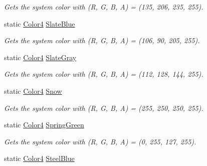 \begin{DoxyCompactItemize}
\begin{DoxyCompactList}\small\item\em Gets the system color with (R, G, B, A) = (135, 206, 235, 255). \end{DoxyCompactList}\item 
static \hyperlink{struct_open_t_k_1_1_graphics_1_1_color4}{Color4} \hyperlink{struct_open_t_k_1_1_graphics_1_1_color4_a7960df3427d00c48be53d56356da9e40}{Slate\-Blue}
\begin{DoxyCompactList}\small\item\em Gets the system color with (R, G, B, A) = (106, 90, 205, 255). \end{DoxyCompactList}\item 
static \hyperlink{struct_open_t_k_1_1_graphics_1_1_color4}{Color4} \hyperlink{struct_open_t_k_1_1_graphics_1_1_color4_ad1e3354b2aed0e0a3f44b18f1d60166e}{Slate\-Gray}
\begin{DoxyCompactList}\small\item\em Gets the system color with (R, G, B, A) = (112, 128, 144, 255). \end{DoxyCompactList}\item 
static \hyperlink{struct_open_t_k_1_1_graphics_1_1_color4}{Color4} \hyperlink{struct_open_t_k_1_1_graphics_1_1_color4_a17de74a9267edab7002c95990e572d38}{Snow}
\begin{DoxyCompactList}\small\item\em Gets the system color with (R, G, B, A) = (255, 250, 250, 255). \end{DoxyCompactList}\item 
static \hyperlink{struct_open_t_k_1_1_graphics_1_1_color4}{Color4} \hyperlink{struct_open_t_k_1_1_graphics_1_1_color4_a7b799bd01f53756825dde720d0169bdf}{Spring\-Green}
\begin{DoxyCompactList}\small\item\em Gets the system color with (R, G, B, A) = (0, 255, 127, 255). \end{DoxyCompactList}\item 
static \hyperlink{struct_open_t_k_1_1_graphics_1_1_color4}{Color4} \hyperlink{struct_open_t_k_1_1_graphics_1_1_color4_a7caf84fc357707b6d4ef01f5f79b1add}{Steel\-Blue}

\end{DoxyCompactItemize}
